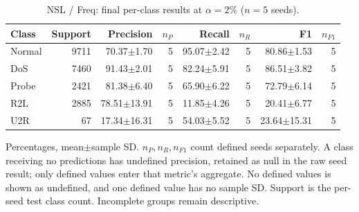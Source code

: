 \begin{table}[t]
\centering\scriptsize
\setlength{\tabcolsep}{3.3pt}
\caption{NSL / Freq: final per-class results at $\alpha=2\%$ ($n=5$ seeds).}\label{tab:forgetting-class-nsl_kdd-freq}
\begin{tabular}{lrrrrrrr}
\toprule
Class & Support & Precision & $n_P$ & Recall & $n_R$ & F1 & $n_{F1}$ \\
\midrule
Normal & 9711 & 70.37$\pm$1.70 & 5 & 95.07$\pm$2.42 & 5 & 80.86$\pm$1.53 & 5 \\
DoS & 7460 & 91.43$\pm$2.01 & 5 & 82.24$\pm$5.91 & 5 & 86.51$\pm$3.82 & 5 \\
Probe & 2421 & 81.38$\pm$6.40 & 5 & 65.90$\pm$6.22 & 5 & 72.79$\pm$6.14 & 5 \\
R2L & 2885 & 78.51$\pm$13.91 & 5 & 11.85$\pm$4.26 & 5 & 20.41$\pm$6.77 & 5 \\
U2R & 67 & 17.34$\pm$16.31 & 5 & 54.03$\pm$5.52 & 5 & 23.64$\pm$15.31 & 5 \\
\bottomrule
\end{tabular}
\par\smallskip\begin{minipage}{0.98\textwidth}\scriptsize Percentages, mean$\pm$sample SD. $n_P,n_R,n_{F1}$ count defined seeds separately. A class receiving no predictions has undefined precision, retained as null in the raw seed result; only defined values enter that metric's aggregate. No defined values is shown as undefined, and one defined value has no sample SD. Support is the per-seed test class count. Incomplete groups remain descriptive.\end{minipage}
\end{table}

